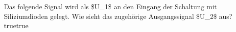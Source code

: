     {Das folgende Signal wird als \$U\_1\$ an den Eingang der Schaltung mit Siliziumdioden gelegt. Wie sieht das zugehörige Ausgangssignal \$U\_2\$ aus?}
    {}
    {}
    {}
    {}
    {true}{true}